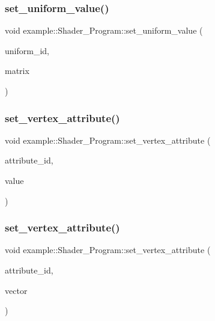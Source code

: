 \mbox{\label{classexample_1_1_shader___program_a8ed8144f9d999bf09e774a4919a449f2}} 
\subsubsection{set\_uniform\_value()\hspace{0.1cm}{\footnotesize\ttfamily [8/8]}}
{\footnotesize\ttfamily void example\+::\+Shader\+\_\+\+Program\+::set\+\_\+uniform\+\_\+value (\begin{DoxyParamCaption}\item[{G\+Lint}]{uniform\+\_\+id,  }\item[{const Matrix44f \&}]{matrix }\end{DoxyParamCaption})\hspace{0.3cm}{\ttfamily [inline]}}

\mbox{\label{classexample_1_1_shader___program_a3f3c9e0b56278a38b467a50a8e52d396}} 
\subsubsection{set\_vertex\_attribute()\hspace{0.1cm}{\footnotesize\ttfamily [1/4]}}
{\footnotesize\ttfamily void example\+::\+Shader\+\_\+\+Program\+::set\+\_\+vertex\+\_\+attribute (\begin{DoxyParamCaption}\item[{G\+Lint}]{attribute\+\_\+id,  }\item[{const float \&}]{value }\end{DoxyParamCaption})\hspace{0.3cm}{\ttfamily [inline]}}

\mbox{\label{classexample_1_1_shader___program_adc75685af2153c0b509722f6ca780c0d}} 
\subsubsection{set\_vertex\_attribute()\hspace{0.1cm}{\footnotesize\ttfamily [2/4]}}
{\footnotesize\ttfamily void example\+::\+Shader\+\_\+\+Program\+::set\+\_\+vertex\+\_\+attribute (\begin{DoxyParamCaption}\item[{G\+Lint}]{attribute\+\_\+id,  }\item[{const Vector2f \&}]{vector }\end{DoxyParamCaption})\hspace{0.3cm}{\ttfamily [inline]}}

